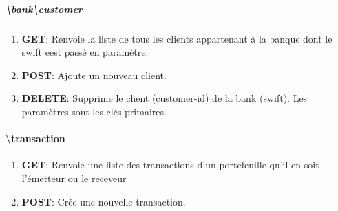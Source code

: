 \documentclass{article}
\begin{document}
    \subparagraph{\textbackslash bank\textbackslash customer}
        \begin{enumerate}
            \item \textbf{GET}: Renvoie la liste de tous les clients appartenant à la banque dont le swift eest
                                passé en paramètre.
            \item \textbf{POST}: Ajoute un nouveau client.
            \item \textbf{DELETE}: Supprime le client (customer-id) de la bank (swift). Les paramètres sont les clés primaires.
        \end{enumerate}


\paragraph{\textbackslash transaction}
    \begin{enumerate}
        \item \textbf{GET}: Renvoie une liste des transactions d'un portefeuille qu'il en soit l'émetteur ou le receveur
        \item \textbf{POST}: Crée une nouvelle transaction.
    \end{enumerate}
\end{document}
